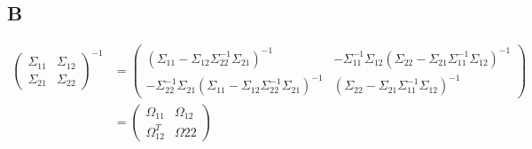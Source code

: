 \documentclass{article}
\begin{document}
\subsection*{B}
\begin{align*}
\begin{pmatrix}
\Sigma_{11} & \Sigma_{12}\\
\Sigma_{21} & \Sigma_{22}
\end{pmatrix}^{-1} &= \begin{pmatrix}
(\Sigma_{11} - \Sigma_{12}\Sigma_{22}^{-1}\Sigma_{21})^{-1}  & -\Sigma_{11}^{-1}\Sigma_{12}(\Sigma_{22} - \Sigma_{21}\Sigma_{11}^{-1}\Sigma_{12})^{-1}  \\
-\Sigma_{22}^{-1}\Sigma_{21}(\Sigma_{11} - \Sigma_{12}\Sigma_{22}^{-1}\Sigma_{21})^{-1} & (\Sigma_{22} - \Sigma_{21}\Sigma_{11}^{-1}\Sigma_{12})^{-1}
\end{pmatrix}\\
&= \begin{pmatrix}
\Omega_{11} & \Omega_{12}\\
\Omega_{12}^T & \Omega{22}
\end{pmatrix}
\end{align*}
\end{document}
